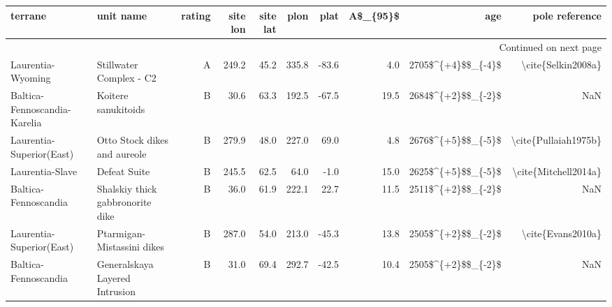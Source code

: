\begin{longtable}{p{1 in}p{1 in}rrrrrrrr}
\toprule
                       terrane &                                          unit name & rating &  site lon &  site lat &  plon &  plat &  A\$\_\{95\}\$ &                    age &                                     pole reference \\
\midrule
\endhead
\midrule
\multicolumn{10}{r}{{Continued on next page}} \\
\midrule
\endfoot

\bottomrule
\endlastfoot
             Laurentia-Wyoming &                            Stillwater Complex - C2 &      A &     249.2 &      45.2 & 335.8 & -83.6 &       4.0 &     2705\$\textasciicircum \{+4\}\$\$\_\{-4\}\$ &                                 \textbackslash cite\{Selkin2008a\} \\
  Baltica-Fennoscandia-Karelia &                                Koitere sanukitoids &      B &      30.6 &      63.3 & 192.5 & -67.5 &      19.5 &     2684\$\textasciicircum \{+2\}\$\$\_\{-2\}\$ &                                                NaN \\
      Laurentia-Superior(East) &                       Otto Stock dikes and aureole &      B &     279.9 &      48.0 & 227.0 &  69.0 &       4.8 &     2676\$\textasciicircum \{+5\}\$\$\_\{-5\}\$ &                               \textbackslash cite\{Pullaiah1975b\} \\
               Laurentia-Slave &                                       Defeat Suite &      B &     245.5 &      62.5 &  64.0 &  -1.0 &      15.0 &     2625\$\textasciicircum \{+5\}\$\$\_\{-5\}\$ &                               \textbackslash cite\{Mitchell2014a\} \\
          Baltica-Fennoscandia &                   Shalskiy thick gabbronorite dike &      B &      36.0 &      61.9 & 222.1 &  22.7 &      11.5 &     2511\$\textasciicircum \{+2\}\$\$\_\{-2\}\$ &                                                NaN \\
      Laurentia-Superior(East) &                         Ptarmigan-Mistassini dikes &      B &     287.0 &      54.0 & 213.0 & -45.3 &      13.8 &     2505\$\textasciicircum \{+2\}\$\$\_\{-2\}\$ &                                  \textbackslash cite\{Evans2010a\} \\
          Baltica-Fennoscandia &                     Generalskaya Layered Intrusion &      B &      31.0 &      69.4 & 292.7 & -42.5 &      10.4 &     2505\$\textasciicircum \{+2\}\$\$\_\{-2\}\$ &                                                NaN \\

\end{longtable}
